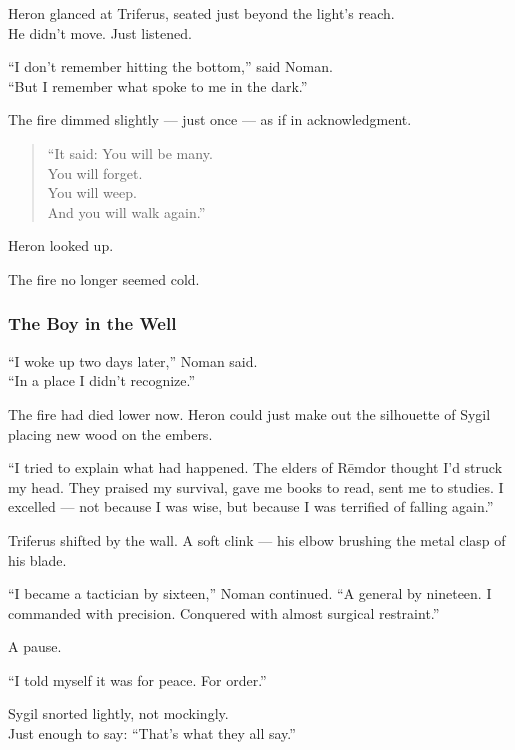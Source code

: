 \documentclass[12pt]{article}
\begin{document}
Heron glanced at Triferus, seated just beyond the light’s reach.\\
He didn’t move. Just listened.

“I don’t remember hitting the bottom,” said Noman.\\
“But I remember what spoke to me in the dark.”

The fire dimmed slightly — just once — as if in acknowledgment.

\begin{quote}
“It said: You will be many.\\
You will forget.\\
You will weep.\\
And you will walk again.”
\end{quote}

Heron looked up.

The fire no longer seemed cold.

\dotfill

\subsubsection{The Boy in the Well}

“I woke up two days later,” Noman said.\\
“In a place I didn’t recognize.”

The fire had died lower now. Heron could just make out the silhouette of Sygil placing new wood on the embers.

“I tried to explain what had happened. The elders of Rēmdor thought I’d struck my head. They praised my survival, gave me books to read, sent me to studies. I excelled — not because I was wise, but because I was terrified of falling again.”

\vspace{1em}

Triferus shifted by the wall. A soft clink — his elbow brushing the metal clasp of his blade.

“I became a tactician by sixteen,” Noman continued. “A general by nineteen. I commanded with precision. Conquered with almost surgical restraint.”

A pause.

“I told myself it was for peace. For order.”

Sygil snorted lightly, not mockingly.\\
Just enough to say: “That’s what they all say.”

\vspace{1em}
\end{document}
